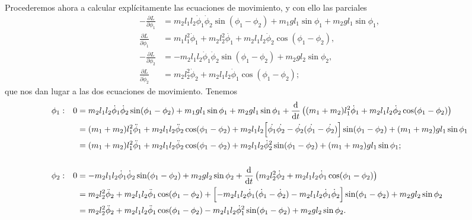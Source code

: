 \documentclass{article}
\begin{document}
Procederemos ahora a calcular expl\'icitamente las ecuaciones de movimiento, y con ello las parciales
\begin{align}
    -\frac{\partial L}{\partial \phi_1} & = m_2l_1l_2 \dot{\phi}_1\dot{\phi}_2 \sin(\phi_1-\phi_2) + m_1gl_1\sin\phi_1+m_2gl_1\sin\phi_1, \\
    \frac{\partial L}{\partial \dot{\phi}_1}& = m_1l_1^2\dot{\phi}_1 + m_2l_2^2\dot{\phi_1} + m_2l_1l_2 \dot{\phi}_2\cos(\phi_1-\phi_2), \\
    -\frac{\partial L}{\partial \phi_2}& = -m_2l_1l_2\dot{\phi}_1\dot{\phi}_2\sin(\phi_1-\phi_2) + m_2gl_2\sin\phi_2, \\
    \frac{\partial L}{\partial \dot{\phi}_2}& = m_2l_2^2\dot{\phi}_2+m_2l_1l_2 \dot{\phi}_1\cos(\phi_1-\phi_2);
\end{align}
que nos dan lugar a las dos ecuaciones de movimiento. Tenemos
\begin{align}
    &\phi_1:& 0&=m_2l_1l_2 \dot{\phi}_1\dot{\phi}_2 \sin(\phi_1-\phi_2) + m_1gl_1\sin\phi_1+m_2gl_1\sin\phi_1+\frac{\mathrm{d}}{\mathrm{d}t}\left((m_1+m_2)l_1^2\dot{\phi}_1+m_2l_1l_2 \dot{\phi}_2\cos(\phi_1-\phi_2)\right) \nonumber \\
    & & &=(m_1+m_2) l_1^2 \ddot{\phi}_1 + m_2l_1l_2 \ddot{\phi}_2 \cos(\phi_1-\phi_2) + m_2l_1l_2\Bigl[\dot{\phi_1}\dot{\phi_2} - \dot{\phi_2}(\dot{\phi_1}-\dot{\phi_2})\Bigr]\sin(\phi_1-\phi_2) + (m_1+m_2)gl_1\sin\phi_1 \nonumber \\
    & & &=(m_1+m_2) l_1^2 \ddot{\phi}_1+m_2l_1l_2 \ddot{\phi}_2 \cos(\phi_1-\phi_2) + m_2l_1l_2\dot{\phi}^2_2\sin(\phi_1-\phi_2) + (m_1+m_2)gl_1\sin\phi_1; \\
        \nonumber \\
    &\phi_2: & 0&= -m_2l_1l_2\dot{\phi}_1\dot{\phi}_2\sin(\phi_1-\phi_2) + m_2gl_2\sin\phi_2 + \frac{\mathrm{d}}{\mathrm{d}t}\left(m_2l_2^2\dot{\phi}_2+m_2l_1l_2 \dot{\phi}_1\cos(\phi_1-\phi_2)\right)\nonumber \\
    & & &= m_2l_2^2\ddot{\phi}_2 + m_2l_1l_2 \ddot{\phi}_1\cos(\phi_1-\phi_2)+ \Bigl[-m_2l_1l_2\dot{\phi}_1(\dot{\phi}_1-\dot{\phi}_2) - m_2l_1l_2\dot{\phi}_1\dot{\phi}_2\Bigr]\sin(\phi_1-\phi_2) + m_2gl_2\sin\phi_2 \nonumber \\
    & & &= m_2l_2^2\ddot{\phi}_2 + m_2l_1l_2 \ddot{\phi}_1\cos(\phi_1-\phi_2) - m_2l_1l_2\dot{\phi}_1^2\sin(\phi_1-\phi_2) + m_2gl_2\sin\phi_2.
\end{align}
\end{document}
